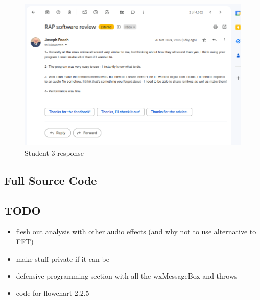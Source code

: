 \documentclass{article}
\begin{document}
	\begin{figure}[H]
		\includegraphics[width=14cm]{./joseph evaluation.png}
		\caption{Student 3 response}
	\end{figure}
	
	\pagebreak
	\subsection{Full Source Code}
	
	\subsection{TODO}
	\begin{itemize}
		\item flesh out analysis with other audio effects (and why not to use alternative to FFT)
		\item make stuff private if it can be
		\item defensive programming section with all the wxMessageBox and throws
		\item code for flowchart 2.2.5
	\end{itemize}
\end{document}
